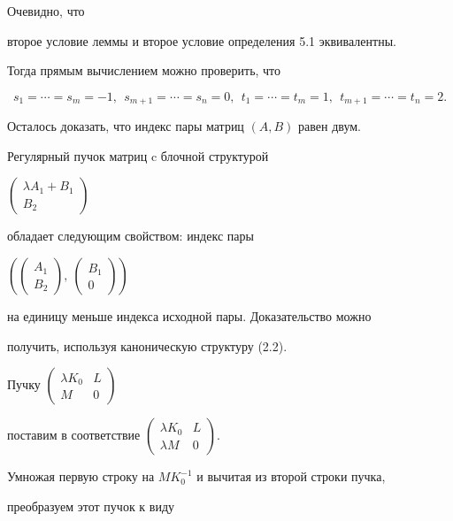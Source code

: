 \begin{pf}


Очевидно, что


второе условие леммы и второе условие определения 5.1 эквивалентны.


Тогда прямым вычислением можно проверить, что


$$


s_1=\dotsb=s_m=-1,\ \ s_{m+1}=\dotsb=s_n=0,\ \ 


t_1=\dotsb=t_m=1, \ \ t_{m+1}=\dotsb=t_n=2.


$$


Осталось доказать, что индекс пары матриц $(A,B)$ равен двум.


Регулярный пучок матриц c блочной структурой


$\left(\begin{smallmatrix}\lambda A_1 +B_1\\ B_2\end{smallmatrix}\right)$


обладает следующим свойством: индекс пары


$\left(\left(\begin{smallmatrix}A_1 \\ B_2\end{smallmatrix}\right),


\ \left(\begin{smallmatrix}B_1 \\ 0\end{smallmatrix}\right )\right)$


на единицу меньше индекса исходной пары. Доказательство можно


получить, используя каноническую структуру (2.2).





Пучку $\left(


\begin{smallmatrix} \lambda K_0 & L \\ M & 0 \end{smallmatrix}\right)$


поставим в соответствие $\left(\begin{smallmatrix} \lambda K_0 & L \\


\lambda M & 0 \end{smallmatrix}\right)$.


Умножая первую строку на $MK_0^{-1}$ и вычитая из второй строки пучка,


преобразуем этот пучок к виду



\end{pf}
